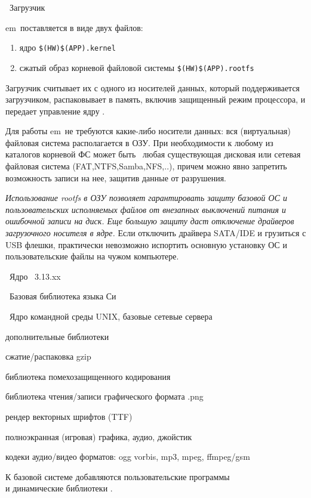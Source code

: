 
\begin{description}
  \item{}\ Загрузчик

em\linux\ поставляется в виде двух файлов:

\begin{enumerate}[nosep]
  \item ядро \verb|$(HW)$(APP).kernel|
  \item сжатый образ корневой файловой системы \verb|$(HW)$(APP).rootfs|
\end{enumerate}

Загрузчик считывает их с одного из носителей данных, который поддерживается
загрузчиком, распаковывает в память, включив защищенный режим
процессора, и передает управление ядру \linux.

\begin{framed}\noindent
Для работы em\linux\ не требуются какие-либо носители данных: вся
(виртуальная) файловая система располагается в ОЗУ. При необходимости к любому
из каталогов корневой ФС может быть \ любая существующая
дисковая или сетевая файловая система (FAT,NTFS,Samba,NFS,..), причем можно явно
запретить возможность записи на нее, защитив данные от
разрушения.

\emph{Использование rootfs в ОЗУ позволяет гарантировать защиту базовой ОС и
пользовательских исполняемых файлов от внезапных выключений питания и
ошибочной записи на диск. Еще большую защиту даст отключение драйверов
загрузочного носителя в ядре.} Если отключить драйвера SATA/IDE и грузиться
с USB флешки, практически невозможно испортить основную установку ОС и
пользовательские файлы на чужом компьютере.
\end{framed}
   
  \item{}\ Ядро \linux\ 3.13.xx
  \item{}\ Базовая библиотека языка Си
  \item{}\ Ядро командной среды UNIX, базовые сетевые сервера
  \item{дополнительные библиотеки}
  \begin{description}[nosep]
    \item{} сжатие/распаковка gzip
    \item{} библиотека помехозащищенного кодирования
    \item{} библиотека чтения/записи графического формата .png 
    \item{} рендер векторных шрифтов (TTF) 
	\item{} полноэкранная (игровая) графика, аудио, джойстик
  \end{description}
  \item{кодеки аудио/видео форматов}: ogg vorbis, mp3, mpeg, ffmpeg/gsm
\end{description}

\begin{framed}\noindent
К базовой системе добавляются пользовательские
программы \\ и динамические библиотеки .
\end{framed}

